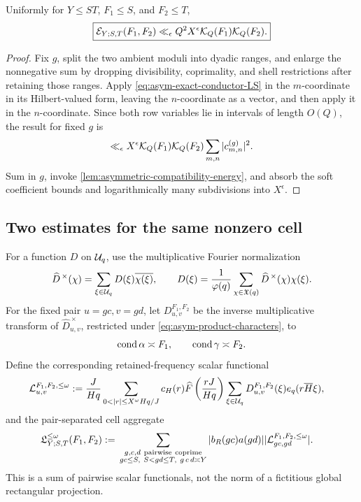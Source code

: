 \begin{theorem}
\label{thm:asymmetric-tensor-energy}
Uniformly for \(Y\le ST\), \(F_1\le S\), and \(F_2\le T\),
\begin{equation}
 \boxed{
 \mathcal E_{Y;S,T}(F_1,F_2)
 \ll_\epsilon Q^2X^\epsilon
 \mathcal K_Q(F_1)\mathcal K_Q(F_2).}
 \label{eq:asymmetric-tensor-energy}
\end{equation}
\end{theorem}

\begin{proof}
Fix \(g\), split the two ambient moduli into dyadic ranges, and enlarge
the nonnegative sum by dropping divisibility, coprimality, and shell
restrictions after retaining those ranges.  Apply
\eqref{eq:asym-exact-conductor-LS} in the \(m\)-coordinate in its
Hilbert-valued form, leaving the \(n\)-coordinate as a vector, and then
apply it in the \(n\)-coordinate.  Since both row variables lie in
intervals of length \(O(Q)\), the result for fixed \(g\) is
\[
 \ll_\epsilon X^\epsilon
 \mathcal K_Q(F_1)\mathcal K_Q(F_2)
 \sum_{m,n}|c_{m,n}^{(g)}|^2.
\]
Sum in \(g\), invoke
\cref{lem:asymmetric-compatibility-energy}, and absorb the soft
coefficient bounds and logarithmically many subdivisions into
\(X^\epsilon\).
\end{proof}

\subsection{Two estimates for the same nonzero cell}

For a function \(D\) on \(\mathcal U_q\), use the multiplicative Fourier
normalization
\[
 \widehat D^{\,\times}(\chi)
 =\sum_{\xi\in\mathcal U_q}D(\xi)\overline{\chi(\xi)},
 \qquad
 D(\xi)=\frac1{\varphi(q)}
 \sum_{\chi\in\mathfrak X(q)}
 \widehat D^{\,\times}(\chi)\chi(\xi).
\]
For the fixed pair \(u=gc,v=gd\), let
\(D_{u,v}^{F_1,F_2}\) be the inverse multiplicative transform of
\(\widehat D_{u,v}^{\,\times}\), restricted under
\eqref{eq:asym-product-characters}, to
\[
 \operatorname{cond}\alpha\asymp F_1,\qquad
 \operatorname{cond}\gamma\asymp F_2.
\]
Define the corresponding retained-frequency scalar functional
\begin{align}
 \cL_{u,v}^{F_1,F_2,\le\omega}
 :={}&
 \frac{J}{Hq}\sum_{0<|r|\le X^\omega Hq/J}c_H(r)
 \widehat F\left(\frac{rJ}{Hq}\right)
 \sum_{\xi\in\cU_q}D_{u,v}^{F_1,F_2}(\xi)
 e_q(r\overline H\xi),
 \label{eq:pair-cell-functional}
\end{align}
and the pair-separated cell aggregate
\begin{align}
 \mathfrak L_{Y;S,T}^{\le\omega}(F_1,F_2)
 :={}&
 \sum_{\substack{g,c,d\ \mathrm{pairwise\ coprime}\\
                  gc\le S,\ S<gd\le T,\ g\,c\,d\asymp Y}}
 |b_R(gc)a(gd)|
 |\mathcal L_{gc,gd}^{F_1,F_2,\le\omega}|.
 \label{eq:asymmetric-cell-definition}
\end{align}
This is a sum of pairwise scalar functionals, not the norm of a
fictitious global rectangular projection.

